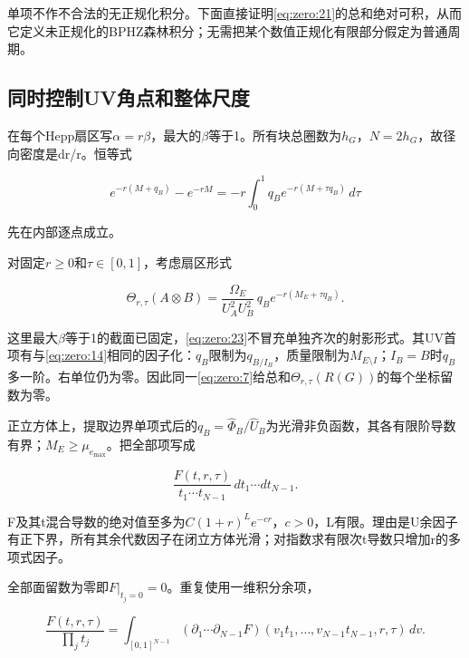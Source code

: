 \documentclass[11pt,a4paper,oneside]{ctexrep}
\theoremstyle{cnplain}
\theoremstyle{definition}
\theoremstyle{remark}
\begin{document}
单项不作不合法的无正规化积分。下面直接证明\eqref{eq:zero:21}的总和绝对可积，从而它定义未正规化的BPHZ森林积分；无需把某个数值正规化有限部分假定为普通周期。

\subsection{同时控制UV角点和整体尺度}\label{sec:zero:8.2}

在每个Hepp扇区写\(\alpha =r\beta \)，最大的\(\beta \)等于1。所有块总圈数为\(h_G\)，\(N=2h_G\)，故径向密度是dr/r。恒等式

\begin{equation}
e^{-r(M+q_B)}-e^{-rM}
      =-r\int_0^1q_Be^{-r(M+\tau q_B)}\,d\tau                 \label{eq:zero:22}
\end{equation}

先在内部逐点成立。

对固定\(r\ge 0\)和\(\tau \in [0,1]\)，考虑扇区形式

\begin{equation}
\Theta_{r,\tau}(A\otimes B)
   =\frac{\Omega_E}{U_A^2U_B^2}\,
                         q_Be^{-r(M_E+\tau q_B)}.             \label{eq:zero:23}
\end{equation}

这里最大\(\beta \)等于1的截面已固定，\eqref{eq:zero:23}不冒充单独齐次的射影形式。其UV首项有与\eqref{eq:zero:14}相同的因子化：\(q_B\)限制为\(q_{B/I_B}\)，质量限制为\(M_{E\setminus I}\)；\(I_B=B\)时\(q_B\)多一阶。右单位仍为零。因此同一\eqref{eq:zero:7}给总和\(\Theta _{r,\tau }(R(G))\)的每个坐标留数为零。

正立方体上，提取边界单项式后的\(q_B=\widehat\Phi _B/\widehat U_B\)为光滑非负函数，其各有限阶导数有界；\(M_E\ge \mu _{e_{\mathrm{max}}}\)。把全部项写成

\begin{equation}
\frac{F(t,r,\tau)}{t_1\cdots t_{N-1}}\,
                      dt_1\cdots dt_{N-1}.
\end{equation}

F及其t混合导数的绝对值至多为\(C(1+r)^L e^{-cr}\)，\(c>0\)，L有限。理由是U余因子有正下界，所有其余代数因子在闭立方体光滑；对指数求有限次t导数只增加r的多项式因子。

全部面留数为零即\(F|_{t_j=0}=0\)。重复使用一维积分余项，

\begin{equation}
\frac{F(t,r,\tau)}{\prod_jt_j}
 =\int_{[0,1]^{N-1}}
   (\partial_1\cdots\partial_{N-1}F)
              (v_1t_1,\ldots,v_{N-1}t_{N-1},r,\tau)\,dv.     \label{eq:zero:24}
\end{equation}
\end{document}
